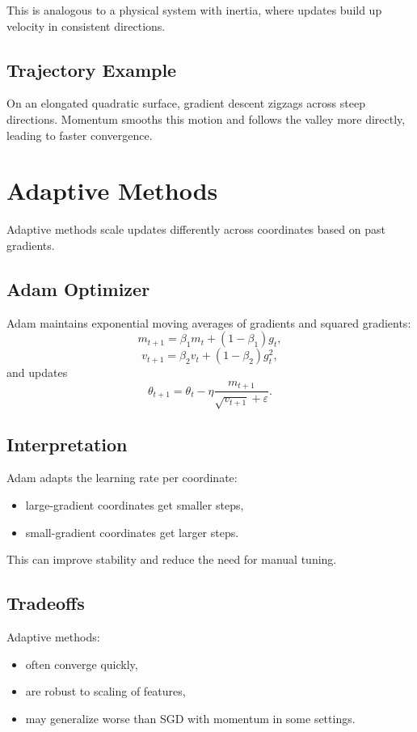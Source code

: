 This is analogous to a physical system with inertia, where updates build up velocity in consistent directions.

\subsection{Trajectory Example}

On an elongated quadratic surface, gradient descent zigzags across steep directions. Momentum smooths this motion and follows the valley more directly, leading to faster convergence.

\section{Adaptive Methods}

Adaptive methods scale updates differently across coordinates based on past gradients.

\subsection{Adam Optimizer}

Adam maintains exponential moving averages of gradients and squared gradients:
\[
m_{t+1}=\beta_1 m_t + (1-\beta_1) g_t,
\]
\[
v_{t+1}=\beta_2 v_t + (1-\beta_2) g_t^2,
\]
and updates
\[
\theta_{t+1}=\theta_t-\eta \frac{m_{t+1}}{\sqrt{v_{t+1}}+\varepsilon}.
\]

\subsection{Interpretation}

Adam adapts the learning rate per coordinate:
\begin{itemize}
    \item large-gradient coordinates get smaller steps,
    \item small-gradient coordinates get larger steps.
\end{itemize}

This can improve stability and reduce the need for manual tuning.

\subsection{Tradeoffs}

Adaptive methods:
\begin{itemize}
    \item often converge quickly,
    \item are robust to scaling of features,
    \item may generalize worse than SGD with momentum in some settings.
\end{itemize}


